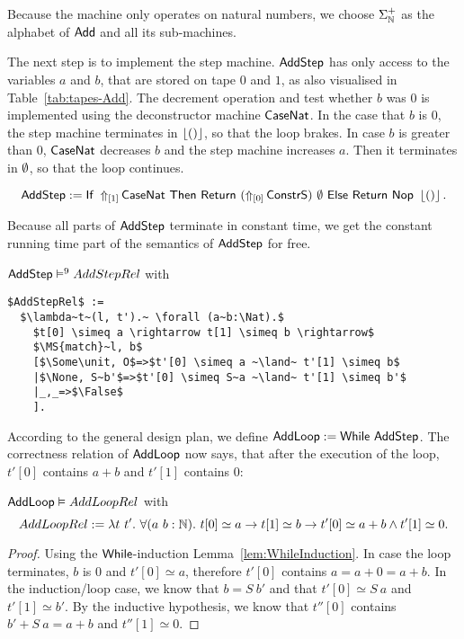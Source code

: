 Because the machine only operates on natural numbers, we choose $\Sigma_\Nat^+$ as the alphabet of $\MS{Add}$ and all its sub-machines.

The next step is to implement the step machine.  $\MS{AddStep}$ has only access to the variables $a$ and $b$, that are stored on tape $0$ and $1$, as
also visualised in Table~\ref{tab:tapes-Add}.  The decrement operation and test whether $b$ was $0$ is implemented using the deconstructor machine
$\MS{CaseNat}$.  In the case that $b$ is $0$, the step machine terminates in $\Some\unit$, so that the loop brakes.  In case $b$ is greater than $0$,
$\MS{CaseNat}$ decreases $b$ and the step machine increases $a$.  Then it terminates in $\None$, so that the loop continues.
\begin{definition}
  \label{def:Add_Step}
  \[
    \MS{AddStep} := \If{\LiftTapes{\MS{CaseNat}}{\Vector{1}}}{\Return{(\LiftTapes{\MS{ConstrS}}{\Vector{0}})}{\None}}{\Return{\Nop}{\Some\unit}}.
  \]
\end{definition}

Because all parts of $\MS{AddStep}$ terminate in constant time, we get the constant running time part of the semantics of $\MS{AddStep}$ for free.
\begin{lemma}
  \label{lem:Add_Step_Sem}
  $\MS{AddStep} \RealiseIn{9} AddStepRel$ with
\begin{lstlisting}[style=semicoqstyle]
$AddStepRel$ :=
  $\lambda~t~(l, t').~ \forall (a~b:\Nat).$
    $t[0] \simeq a \rightarrow t[1] \simeq b \rightarrow$
    $\MS{match}~l, b$
    [$\Some\unit, O$=>$t'[0] \simeq a ~\land~ t'[1] \simeq b$
    |$\None, S~b'$=>$t'[0] \simeq S~a ~\land~ t'[1] \simeq b'$
    |_,_=>$\False$
    ].
\end{lstlisting}
\end{lemma}

According to the general design plan, we define $\MS{AddLoop} := \While~\MS{AddStep}$.  The correctness relation of $\MS{AddLoop}$ now says, that
after the execution of the loop, $t'[0]$ contains $a+b$ and $t'[1]$ contains $0$:
\begin{lemma}
  \label{lem:Add_Loop_Realise}
  $\MS{AddLoop} \Realise AddLoopRel$ with
  \[
    AddLoopRel := \lambda t~t'.~\forall (a~b:\Nat).~t[0] \simeq a \rightarrow t[1] \simeq b \rightarrow t'[0] \simeq a+b \land t'[1] \simeq 0.
  \]
\end{lemma}
\begin{proof}
  Using the $\While$-induction Lemma~\ref{lem:WhileInduction}.  In case the loop terminates, $b$ is $0$ and $t'[0] \simeq a$, therefore $t'[0]$
  contains $a=a+0=a+b$.  In the induction/loop case, we know that $b=S~b'$ and that $t'[0] \simeq S~a$ and $t'[1] \simeq b'$.  By the inductive
  hypothesis, we know that $t''[0]$ contains $b' + S~a = a+b$ and $t''[1] \simeq 0$.
\end{proof}

